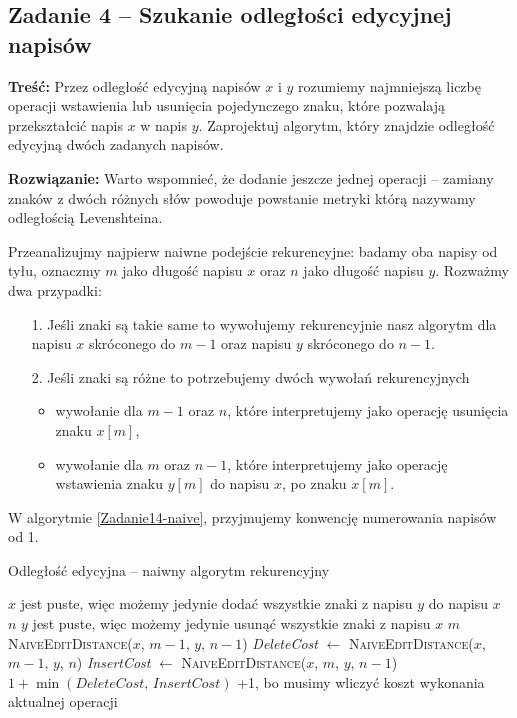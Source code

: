 \subsection{Zadanie 4 -- Szukanie odległości edycyjnej napisów}
\textbf{Treść:} Przez odległość edycyjną napisów 
$x$ i $y$ rozumiemy najmniejszą liczbę operacji wstawienia lub usunięcia
pojedynczego znaku, które pozwalają przekształcić napis $x$ w napis $y$.
Zaprojektuj algorytm, który znajdzie odległość 
edycyjną dwóch zadanych napisów.


\textbf{Rozwiązanie:}
Warto wspomnieć, że dodanie jeszcze jednej operacji --
zamiany znaków z dwóch różnych słów powoduje powstanie metryki
którą nazywamy odległością Levenshteina.

Przeanalizujmy najpierw naiwne podejście rekurencyjne: badamy 
oba napisy od tyłu, oznaczmy $m$ jako długość napisu $x$
oraz $n$ jako długość napisu $y$. Rozważmy dwa przypadki: 

\begin{itemize}
	\item[1.] Jeśli znaki są takie same to wywołujemy rekurencyjnie
	nasz algorytm dla napisu $x$ skróconego do $m - 1$ oraz 
	napisu $y$ skróconego do $n - 1$.
	\item[2.] Jeśli znaki są różne to potrzebujemy dwóch wywołań rekurencyjnych
	\begin{itemize}
		\item wywołanie dla $m - 1$ oraz $n$, które interpretujemy jako operację usunięcia znaku $x[m]$,
		\item wywołanie dla $m$ oraz $n - 1$, które
		interpretujemy jako operację wstawienia znaku $y[m]$ do napisu $x$,
		po znaku $x[m]$.
	\end{itemize} 
\end{itemize}

W algorytmie \ref{Zadanie14-naive}, przyjmujemy konwencję numerowania napisów od 1.
\begin{algorithm}[H]
	\caption{Odległość edycyjna -- naiwny algorytm rekurencyjny}
	\begin{algorithmic}[1]
		\Comment $x$ jest puste, więc możemy jedynie dodać wszystkie znaki z napisu $y$ do napisu $x$
		\State \Return $n$ 
		\EndIf
		\Comment $y$ jest puste, więc możemy jedynie usunąć wszystkie znaki z napisu $x$
		\State \Return $m$ 
		\EndIf
		\State \Return \textsc{NaiveEditDistance}($x$, $m - 1$, $y$, $n - 1$)
		\Else
		\State \textit{DeleteCost} $\gets$ \textsc{NaiveEditDistance}($x$, $m - 1$, $y$, $n$)
		\State \textit{InsertCost} $\gets$ \textsc{NaiveEditDistance}($x$, $m$, $y$, $n - 1$)
		\State \Return $1 + \min(\textit{DeleteCost, InsertCost})$ \Comment +1, bo musimy wliczyć koszt wykonania aktualnej operacji
		\EndIf
		\EndProcedure 
	\end{algorithmic}
	\label{Zadanie14-naive}
\end{algorithm}

